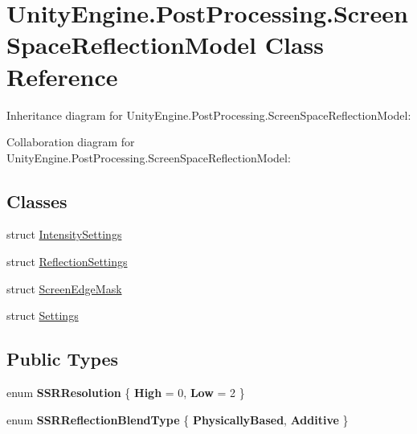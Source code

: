 \hypertarget{class_unity_engine_1_1_post_processing_1_1_screen_space_reflection_model}{}\section{Unity\+Engine.\+Post\+Processing.\+Screen\+Space\+Reflection\+Model Class Reference}
\label{class_unity_engine_1_1_post_processing_1_1_screen_space_reflection_model}


Inheritance diagram for Unity\+Engine.\+Post\+Processing.\+Screen\+Space\+Reflection\+Model\+:


Collaboration diagram for Unity\+Engine.\+Post\+Processing.\+Screen\+Space\+Reflection\+Model\+:
\subsection*{Classes}
\begin{DoxyCompactItemize}
\item 
struct \hyperlink{struct_unity_engine_1_1_post_processing_1_1_screen_space_reflection_model_1_1_intensity_settings}{Intensity\+Settings}
\item 
struct \hyperlink{struct_unity_engine_1_1_post_processing_1_1_screen_space_reflection_model_1_1_reflection_settings}{Reflection\+Settings}
\item 
struct \hyperlink{struct_unity_engine_1_1_post_processing_1_1_screen_space_reflection_model_1_1_screen_edge_mask}{Screen\+Edge\+Mask}
\item 
struct \hyperlink{struct_unity_engine_1_1_post_processing_1_1_screen_space_reflection_model_1_1_settings}{Settings}
\end{DoxyCompactItemize}
\subsection*{Public Types}
\begin{DoxyCompactItemize}
\item 
\mbox{\label{class_unity_engine_1_1_post_processing_1_1_screen_space_reflection_model_acbe36890d4b8ede4152e13108af7ba1f}} 
enum {\bfseries S\+S\+R\+Resolution} \{ {\bfseries High} = 0, 
{\bfseries Low} = 2
 \}
\item 
\mbox{\label{class_unity_engine_1_1_post_processing_1_1_screen_space_reflection_model_acb7310312d36f7cf7cf72d923ee5271b}} 
enum {\bfseries S\+S\+R\+Reflection\+Blend\+Type} \{ {\bfseries Physically\+Based}, 
{\bfseries Additive}
 \}
\end{DoxyCompactItemize}
